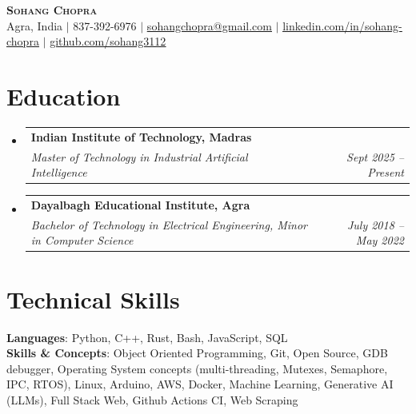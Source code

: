 \documentclass[letterpaper,11pt]{article}
\makeatletter
\newcommand{\resumeSubheading}[4]{
  \vspace{-2pt}\item
    \begin{tabular*}{0.97\textwidth}[t]{l@{\extracolsep{\fill}}r}
      \textbf{#1} & #2 \\
      \textit{\small#3} & \textit{\small #4} \\
    \end{tabular*}\vspace{-7pt}
}
\newcommand{\resumeSubHeadingListStart}{\begin{itemize}[leftmargin=0.15in, label={}]}
\newcommand{\resumeSubHeadingListEnd}{\end{itemize}}
\makeatother
\begin{document}
\begin{center}
    \textbf{\Huge \scshape Sohang Chopra} \\ \vspace{1pt}
    \small Agra, India $|$ \vspace{1pt}
    \small 837-392-6976 $|$ \href{mailto:sohangchopra@gmail.com}{\underline{sohangchopra@gmail.com}} $|$ 
    \href{https://linkedin.com/in/sohang-chopra}{\underline{linkedin.com/in/sohang-chopra}} $|$
    \href{https://github.com/sohang3112}{\underline{github.com/sohang3112}}
\end{center}

\section{Education}
  \resumeSubHeadingListStart
    \resumeSubheading
      {Indian Institute of Technology, Madras}
      {}
      {Master of Technology in Industrial Artificial Intelligence}
      {Sept 2025 -- Present}
  
    \resumeSubheading
      {Dayalbagh Educational Institute, Agra}{}
      {Bachelor of Technology in Electrical Engineering, Minor in Computer Science}{July 2018 -- May 2022}
  \resumeSubHeadingListEnd

\section{Technical Skills}
 \begin{itemize}[leftmargin=0.15in, label={}]
    \small{\item{
     \textbf{Languages}{: Python, C++, Rust, Bash, JavaScript, SQL} \\
     \textbf{Skills \& Concepts}{: Object Oriented Programming, Git, Open Source, GDB debugger, Operating System concepts (multi-threading, Mutexes, Semaphore, IPC, RTOS), Linux, Arduino, AWS, Docker, Machine Learning, Generative AI (LLMs), Full Stack Web,  Github Actions CI, Web Scraping} \\
    }}
 \end{itemize}
\end{document}
